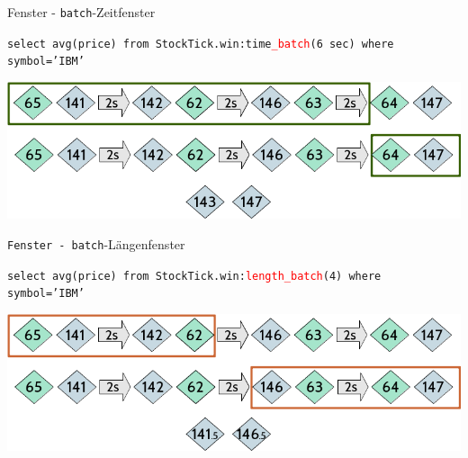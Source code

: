 \documentclass[usenames,dvipsnames]{beamer}
\begin{document}
\begin{frame}{Fenster - \texttt{batch}-Zeitfenster}
\begin{exampleblock}{}
    \begin{center}
        \texttt{select  avg(price) from StockTick.win:time\textcolor{red}{\_batch}(6 sec) 
        where symbol='IBM'}
    \end{center}
\end{exampleblock}
\vspace{1cm}
\begin{center}
    \includegraphics[scale=0.5]{img/solution-4}
\end{center}
\end{frame}
\begin{frame}{\texttt{Fenster - batch}-Längenfenster}
\begin{exampleblock}{}
    \begin{center}
        \texttt{select  avg(price) from 
        StockTick.win:\textcolor{red}{length\_batch}(4) where symbol='IBM'}
    \end{center}
\end{exampleblock}
\vspace{1cm}
\begin{center}
    \includegraphics[scale=0.5]{img/solution-5}
\end{center}

\end{frame}
\end{document}
